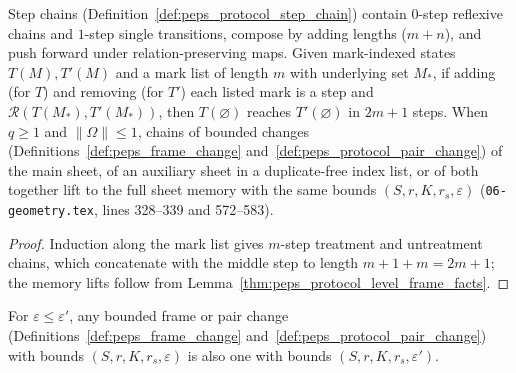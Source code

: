 \begin{lemma}
    \label{lem:peps_protocol_change_chains}
    \leanok
    Step chains (Definition~\ref{def:peps_protocol_step_chain}) contain $0$-step reflexive chains and $1$-step single transitions, compose by adding lengths ($m+n$), and push forward under relation-preserving maps. Given mark-indexed states $T(M),T'(M)$ and a mark list of length $m$ with underlying set $M_*$, if adding (for $T$) and removing (for $T'$) each listed mark is a step and $\mathcal R(T(M_*),T'(M_*))$, then $T(\varnothing)$ reaches $T'(\varnothing)$ in $2m+1$ steps. When $q\ge1$ and $\lVert\Omega\rVert\le1$, chains of bounded changes (Definitions~\ref{def:peps_frame_change} and~\ref{def:peps_protocol_pair_change}) of the main sheet, of an auxiliary sheet in a duplicate-free index list, or of both together lift to the full sheet memory with the same bounds $(S,r,K,r_s,\varepsilon)$ (\texttt{06-geometry.tex}, lines 328--339 and 572--583).
\end{lemma}

\begin{proof}\leanok
    Induction along the mark list gives $m$-step treatment and untreatment chains, which concatenate with the middle step to length $m+1+m=2m+1$; the memory lifts follow from Lemma~\ref{thm:peps_protocol_level_frame_facts}.
\end{proof}

\begin{lemma}
    \label{lem:peps_protocol_frame_change_error_mono}
    \leanok
    For $\varepsilon\le\varepsilon'$, any bounded frame or pair change (Definitions~\ref{def:peps_frame_change} and~\ref{def:peps_protocol_pair_change}) with bounds $(S,r,K,r_s,\varepsilon)$ is also one with bounds $(S,r,K,r_s,\varepsilon')$.
\end{lemma}

